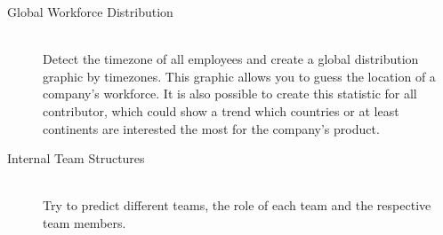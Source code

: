 \begin{description}
    \item[Global Workforce Distribution] \hfill \\
        Detect the timezone of all employees and create a global distribution graphic by timezones.
        This graphic allows you to guess the location of a company's workforce.
        It is also possible to create this statistic for all contributor, which could show a trend which countries or at least continents are interested the most for the company's product.

    \item[Internal Team Structures] \hfill \\
        Try to predict different teams, the role of each team and the respective team members.
\end{description}
